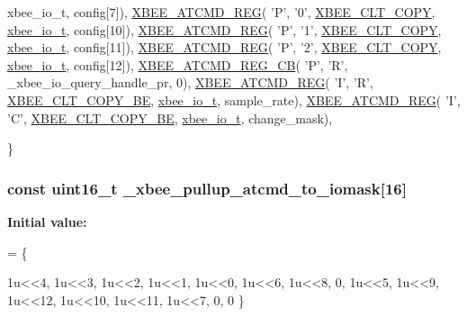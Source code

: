 \begin{DoxyCode}
{      xbee\_io\_t}, config[7]),
   \hyperlink{group__xbee__atcmd_gaafe33c3d8ea48b42b25d1183eaf93071}{XBEE\_ATCMD\_REG}( \textcolor{charliteral}{'P'}, \textcolor{charliteral}{'0'}, \hyperlink{group__xbee__atcmd_gga1bd8ecd38c107579d20ded3c79a7d70baef8d715c8725d801676943b868508633}{XBEE\_CLT\_COPY}, \hyperlink{structxbee__io__t}{
      xbee\_io\_t}, config[10]),
   \hyperlink{group__xbee__atcmd_gaafe33c3d8ea48b42b25d1183eaf93071}{XBEE\_ATCMD\_REG}( \textcolor{charliteral}{'P'}, \textcolor{charliteral}{'1'}, \hyperlink{group__xbee__atcmd_gga1bd8ecd38c107579d20ded3c79a7d70baef8d715c8725d801676943b868508633}{XBEE\_CLT\_COPY}, \hyperlink{structxbee__io__t}{
      xbee\_io\_t}, config[11]),
   \hyperlink{group__xbee__atcmd_gaafe33c3d8ea48b42b25d1183eaf93071}{XBEE\_ATCMD\_REG}( \textcolor{charliteral}{'P'}, \textcolor{charliteral}{'2'}, \hyperlink{group__xbee__atcmd_gga1bd8ecd38c107579d20ded3c79a7d70baef8d715c8725d801676943b868508633}{XBEE\_CLT\_COPY}, \hyperlink{structxbee__io__t}{
      xbee\_io\_t}, config[12]),
   \hyperlink{group__xbee__atcmd_gabbaf60bd4d186b860fd58c8a6111e9f9}{XBEE\_ATCMD\_REG\_CB}( \textcolor{charliteral}{'P'}, \textcolor{charliteral}{'R'}, \_xbee\_io\_query\_handle\_pr, 0),
   \hyperlink{group__xbee__atcmd_gaafe33c3d8ea48b42b25d1183eaf93071}{XBEE\_ATCMD\_REG}( \textcolor{charliteral}{'I'}, \textcolor{charliteral}{'R'}, \hyperlink{group__xbee__atcmd_gga1bd8ecd38c107579d20ded3c79a7d70ba0be0c682bc30049849b0c169b661c537}{XBEE\_CLT\_COPY\_BE}, 
      \hyperlink{structxbee__io__t}{xbee\_io\_t}, sample\_rate),
   \hyperlink{group__xbee__atcmd_gaafe33c3d8ea48b42b25d1183eaf93071}{XBEE\_ATCMD\_REG}( \textcolor{charliteral}{'I'}, \textcolor{charliteral}{'C'}, \hyperlink{group__xbee__atcmd_gga1bd8ecd38c107579d20ded3c79a7d70ba0be0c682bc30049849b0c169b661c537}{XBEE\_CLT\_COPY\_BE}, 
      \hyperlink{structxbee__io__t}{xbee\_io\_t}, change\_mask),

\}
\end{DoxyCode}
\hypertarget{group__xbee__io_gabcf9c9881057623ef7b28330631fad9b}{
\subsubsection[{\-\_\-xbee\-\_\-pullup\-\_\-atcmd\-\_\-to\-\_\-iomask}]{\setlength{\rightskip}{0pt plus 5cm}const {\bf uint16\-\_\-t} \-\_\-xbee\-\_\-pullup\-\_\-atcmd\-\_\-to\-\_\-iomask\mbox{[}16\mbox{]}}}\label{group__xbee__io_gabcf9c9881057623ef7b28330631fad9b}
{\bfseries Initial value\-:}
\begin{DoxyCode}
=
\{
   
   
   1u<<4,
   1u<<3,
   1u<<2,
   1u<<1,
   1u<<0,
   1u<<6,
   1u<<8,
   0,       
   1u<<5,
   1u<<9,
   1u<<12,
   1u<<10,
   1u<<11,
   1u<<7,
   0,
   0
\}
\end{DoxyCode}


